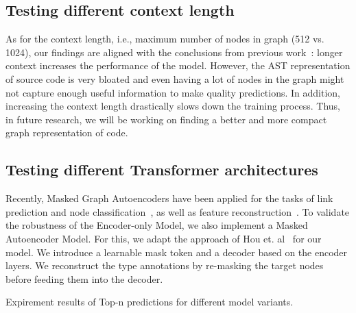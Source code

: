 \subsection{Testing different context length}\label{subsec:testing-different-context-length}

As for the context length, i.e., maximum number of nodes in graph (512 vs. 1024), our findings are aligned with the conclusions from previous work~\cite{arutyunov_big_2022}:
longer context increases the performance of the model.
However, the AST representation of source code is very bloated and even having a lot of nodes in the graph might not capture
enough useful information to make quality predictions.
In addition, increasing the context length drastically slows down the training process.
Thus, in future research, we will be working on finding a better and more compact graph representation of code.

\subsection{Testing different Transformer architectures}\label{subsec:testing-different-transformer-architectures-(encoder-only-vs-encoder-decoder)}

Recently, Masked Graph Autoencoders have been applied for the tasks of link prediction and node classification~\cite{tan2022mgae},
as well as feature reconstruction~\cite{zhang2022graph, hou2022graphmae}.
To validate the robustness of the Encoder-only Model, we also implement a Masked Autoencoder Model.
For this, we adapt the approach of Hou et. al~\cite{hou2022graphmae} for our model.
We introduce a learnable mask token and a decoder based on the encoder layers.
We reconstruct the type annotations by re-masking the target nodes before feeding them into the decoder.

\begin{table}
    \centering
    \caption{Expirement results of Top-n predictions for different model variants.}
    \label{tab:ablation}
    
\end{table}